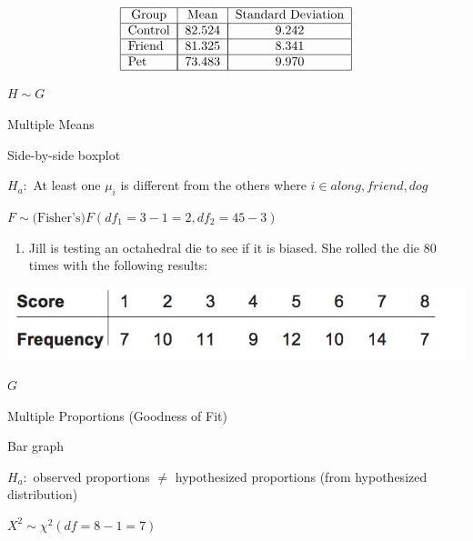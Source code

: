 \documentclass[]{article}
\providecommand{\tightlist}{%
  \setlength{\itemsep}{0pt}\setlength{\parskip}{0pt}}
\newenvironment{tight_enumerate}{ \begin{enumerate}[A)] \setlength{\itemsep}{0pt} \setlength{\parskip}{0pt}}{\end{enumerate}}
\begin{document}
\[%
\begin{tabular}
[c]{|c|c|c|c|}\hline
Group & Mean & Standard Deviation\\\hline
\multicolumn{1}{|l|}{Control} & \multicolumn{1}{|l|}{82.524} & \multicolumn{1}{|c|}{9.242}\\\hline
\multicolumn{1}{|l|}{Friend} & \multicolumn{1}{|l|}{81.325} & \multicolumn{1}{|c|}{8.341}\\\hline
\multicolumn{1}{|l|}{Pet} & \multicolumn{1}{|l|}{73.483} & \multicolumn{1}{|c|}{9.970}\\\hline
\end{tabular}
\]

\begin{tight_enumerate}
  \item $H \sim G$
  \item Multiple Means
  \item Side-by-side boxplot
  \item $H_a:$ At least one $\mu_i$ is different from the others where $i \in {along, friend, dog}$
  \item $F \sim \text{(Fisher's)} F(df_1 = 3 - 1 = 2, df_2 = 45 - 3)$
\end{tight_enumerate}

\begin{enumerate}
\def\labelenumi{\arabic{enumi}.}
\setcounter{enumi}{7}
\tightlist
\item
  Jill is testing an octahedral die to see if it is biased. She rolled
  the die 80 times with the following results:
\end{enumerate}

\begin{center}
\includegraphics{octo_die.png}
\end{center}

\begin{tight_enumerate}
  \item $G$
  \item Multiple Proportions (Goodness of Fit)
  \item Bar graph
  \item $H_a:$ observed proportions $\ne$ hypothesized proportions (from hypothesized distribution)
  \item $X^2 \sim \chi^2 (df = 8 - 1 = 7)$
\end{tight_enumerate}
\end{document}
